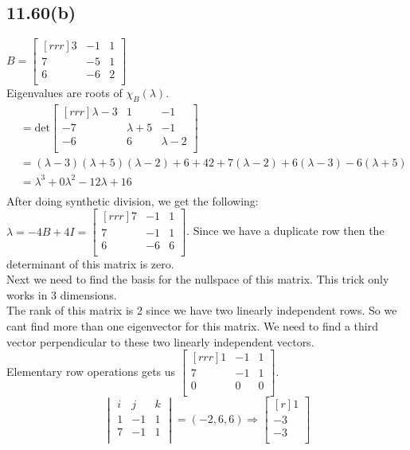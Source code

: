 \documentclass{report}
\begin{document}
\subsection{11.60(b)}
$B=\begin{bmatrix}[rrr]3&-1&1\\7&-5&1\\6&-6&2\\\end{bmatrix}$\\
Eigenvalues are roots of $\chi_B(\lambda)$.
\begin{align*}
&=\mathrm{det}\begin{bmatrix}[rrr]\lambda-3&1&-1\\-7&\lambda+5&-1\\-6&6&\lambda-2\\\end{bmatrix}\\
&=(\lambda-3)(\lambda+5)(\lambda-2)+6+42+7(\lambda-2)+6(\lambda-3)-6(\lambda+5)\\
&=\lambda^3+0\lambda^2-12\lambda+16\\
\end{align*}
After doing synthetic division, we get the following:
$\lambda=-4 B+4I=\begin{bmatrix}[rrr]7&-1&1\\7&-1&1\\6&-6&6\\\end{bmatrix}$. Since we have a duplicate row then the determinant of this matrix is zero.\\
Next we need to find the basis for the nullspace of this matrix. This trick only works in 3 dimensions.\\
The rank of this matrix is 2 since we have two linearly independent rows. So we cant find more than one eigenvector for this matrix. We need to find a third vector perpendicular to these two linearly independent vectors.\\
Elementary row operations gets us $\begin{bmatrix}[rrr]1&-1&1\\7&-1&1\\0&0&0\\\end{bmatrix}$.
\[ \begin{vmatrix}i&j&k\\1&-1&1\\7&-1&1\\\end{vmatrix} = (-2,6,6) \Rightarrow \begin{bmatrix}[r]1\\-3\\-3\\\end{bmatrix} \]
\end{document}
